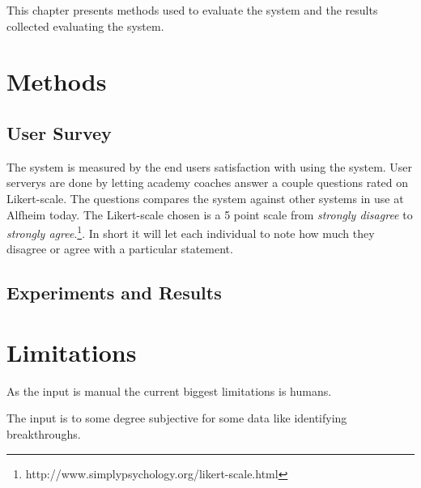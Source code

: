 This chapter presents methods used to evaluate the system and the results collected evaluating the system. 

\section{Methods}

\subsection{User Survey}

The system is measured by the end users satisfaction with using the system. User serverys are done by letting academy coaches answer a couple questions rated on Likert-scale. The questions compares the system against other systems in use at Alfheim today. The Likert-scale chosen is a 5 point scale from \textit{strongly disagree} to \textit{strongly agree}.\footnote{http://www.simplypsychology.org/likert-scale.html}. In short it will let each individual to note how much they disagree or agree with a particular statement.

\subsection{Experiments and Results}



\section{Limitations}

As the input is manual the current biggest limitations is humans. 

The input is to some degree subjective for some data like identifying breakthroughs.